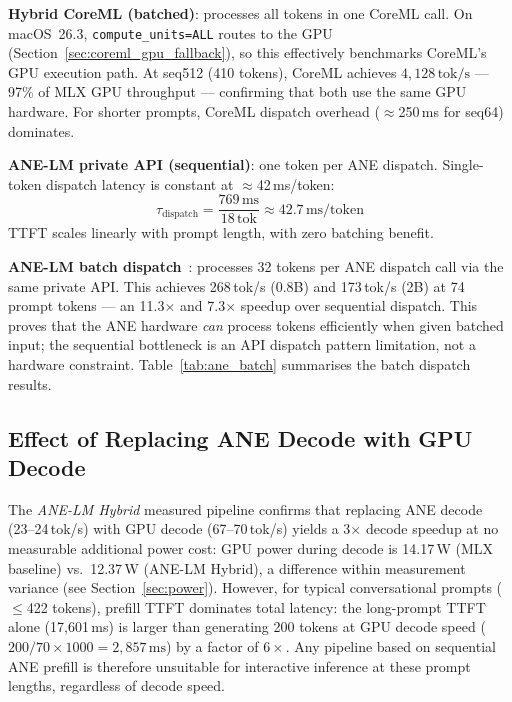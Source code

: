 \documentclass[11pt]{article}
\begin{document}
\textbf{Hybrid CoreML (batched)}: processes all tokens in one CoreML call.
On macOS~26.3, \texttt{compute\_units=ALL} routes to the GPU
(Section~\ref{sec:coreml_gpu_fallback}), so this effectively benchmarks
CoreML's GPU execution path.
At seq512 (410 tokens), CoreML achieves $4{,}128\,\text{tok/s}$ --- 97\%
of MLX GPU throughput --- confirming that both use the same GPU hardware.
For shorter prompts, CoreML dispatch overhead ($\approx$250\,ms for seq64)
dominates.

\textbf{ANE-LM private API (sequential)}: one token per ANE dispatch.
Single-token dispatch latency is constant at $\approx$42\,ms/token:
\begin{equation}
  \tau_{\text{dispatch}} = \frac{769\,\text{ms}}{18\,\text{tok}}
  \approx 42.7\,\text{ms/token}
  \label{eq:dispatch}
\end{equation}
TTFT scales linearly with prompt length, with zero batching benefit.

\textbf{ANE-LM batch dispatch}~\cite{anelmbatch}: processes 32 tokens per
ANE dispatch call via the same private API.
This achieves 268\,tok/s (0.8B) and 173\,tok/s (2B) at 74 prompt tokens
--- an 11.3$\times$ and 7.3$\times$ speedup over sequential dispatch.
This proves that the ANE hardware \emph{can} process tokens efficiently
when given batched input; the sequential bottleneck is an API dispatch
pattern limitation, not a hardware constraint.
Table~\ref{tab:ane_batch} summarises the batch dispatch results.

\subsection{Effect of Replacing ANE Decode with GPU Decode}

The \textit{ANE-LM Hybrid} measured pipeline confirms that replacing ANE
decode (23--24\,tok/s) with GPU decode (67--70\,tok/s) yields a 3$\times$
decode speedup at no measurable additional power cost:
GPU power during decode is 14.17\,W (MLX baseline) vs.\ 12.37\,W
(ANE-LM Hybrid), a difference within measurement variance (see
Section~\ref{sec:power}).
However, for typical conversational prompts ($\leq$422 tokens), prefill
TTFT dominates total latency:
the long-prompt TTFT alone (17{,}601\,ms) is larger than generating
200 tokens at GPU decode speed ($200/70 \times 1000 = 2{,}857\,\text{ms}$)
by a factor of $6\times$.
Any pipeline based on sequential ANE prefill is therefore unsuitable for
interactive inference at these prompt lengths, regardless of decode speed.
\end{document}
